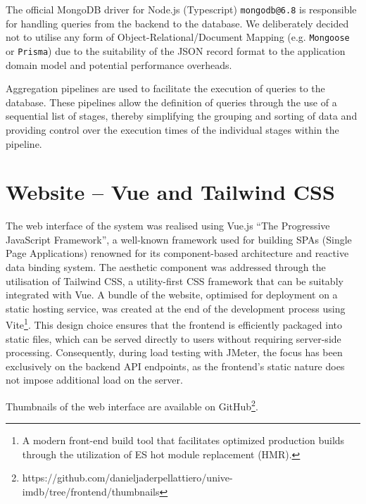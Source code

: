 The official MongoDB driver for Node.js (Typescript) \verb|mongodb@6.8| is responsible for handling queries from the backend to the database.
We deliberately decided not to utilise any form of Object-Relational/Document Mapping (e.g. \verb|Mongoose| or \verb|Prisma|) due to the suitability of the JSON record format to the application domain model and potential performance overheads.

Aggregation pipelines are used to facilitate the execution of queries to the database.
These pipelines allow the definition of queries through the use of a sequential list of stages, thereby simplifying the grouping and sorting of data and providing control over the execution times of the individual stages within the pipeline.

\section{Website -- Vue and Tailwind CSS}

The web interface of the system was realised using Vue.js ``The Progressive JavaScript Framework'', a well-known framework used for building SPAs (Single Page Applications) renowned for its component-based architecture and reactive data binding system.
The aesthetic component was addressed through the utilisation of Tailwind CSS, a utility-first CSS framework that can be suitably integrated with Vue.
A bundle of the website, optimised for deployment on a static hosting service, was created at the end of the development process using Vite\footnote[4]{A modern front-end build tool that facilitates optimized production builds through the utilization of ES hot module replacement (HMR).}.
This design choice ensures that the frontend is efficiently packaged into static files, which can be served directly to users without requiring server-side processing.
Consequently, during load testing with JMeter, the focus has been exclusively on the backend API endpoints, as the frontend's static nature does not impose additional load on the server.

Thumbnails of the web interface are available on GitHub\footnote[5]{https://github.com/danieljaderpellattiero/unive-imdb/tree/frontend/thumbnails}.
